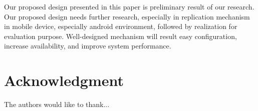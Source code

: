 \documentclass[conference]{IEEEtran}
\begin{document}
Our proposed design presented in this paper is preliminary result of our research. Our proposed design needs further research, especially in replication mechanism in mobile device, especially android environment, followed by realization for evaluation purpose. Well-designed mechanism will result easy configuration, increase availability, and improve system performance.






\section*{Acknowledgment}


The authors would like to thank...







%







\end{document}
